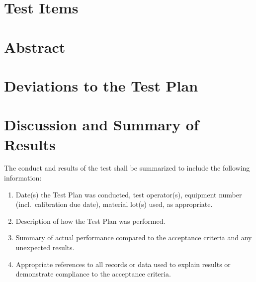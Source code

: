 \documentclass[report]{mcitestdoc}
\begin{document}
\section{Test Items}

\section{Abstract}

\section{Deviations to the Test Plan}

\section{Discussion and Summary of Results}
\begin{hintblock}
The conduct and results of the test shall be summarized to include the following information:
\begin{enumerate}
  \item Date(s) the Test Plan was conducted, test operator(s), equipment number (incl.\ calibration due date), material lot(s) used, as appropriate.
  \item Description of how the Test Plan was performed.
  \item Summary of actual performance compared to the acceptance criteria and any unexpected results.
  \item Appropriate references to all records or data used to explain results or demonstrate compliance to the acceptance criteria.
\end{enumerate}
\end{hintblock}
\end{document}
